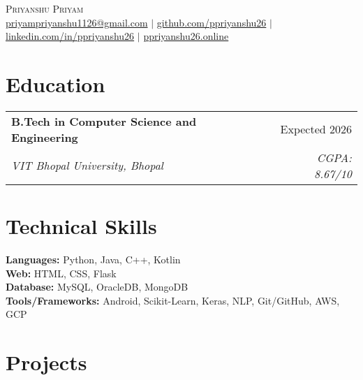 \documentclass[a4paper,10pt]{article}
\makeatletter
\newcommand{\resumeSubheading}[4]{
  \vspace{1pt}\item
    \begin{tabular*}{\textwidth}{l@{\extracolsep{\fill}}r}
      \textbf{#1} & #2 \\
      \textit{\small#3} & \textit{\small #4} \\
    \end{tabular*}
}
\makeatother
\begin{document}
\begin{center}
  {\Huge \scshape Priyanshu Priyam} \\ \vspace{1pt}
  \href{mailto:priyampriyanshu1126@gmail.com}{priyampriyanshu1126@gmail.com} $|$
  \href{https://github.com/ppriyanshu26}{github.com/ppriyanshu26} $|$
  \href{https://linkedin.com/in/ppriyanshu26}{linkedin.com/in/ppriyanshu26} $|$
  \href{https://ppriyanshu26.online/}{ppriyanshu26.online}
\end{center}

\vspace{-4pt}
\section{Education}

\vspace{-4pt}
\begin{flushleft}
  \hspace{1.5em}
  \resumeSubheading
    {B.Tech in Computer Science and Engineering}{Expected 2026}
    {VIT Bhopal University, Bhopal}{CGPA: 8.67/10}
\end{flushleft}

\vspace{-4pt}
\section{Technical Skills}

\vspace{-4pt}
\hspace{1.5em}
\begin{flushleft}
  \textbf{Languages:} Python, Java, C++, Kotlin \\[6pt]
  \textbf{Web:} HTML, CSS, Flask \\[6pt]
  \textbf{Database:} MySQL, OracleDB, MongoDB \\[6pt]
  \textbf{Tools/Frameworks:} Android, Scikit-Learn, Keras, NLP, Git/GitHub, AWS, GCP
\end{flushleft}



\vspace{-4pt}
\section{Projects}
\end{document}
